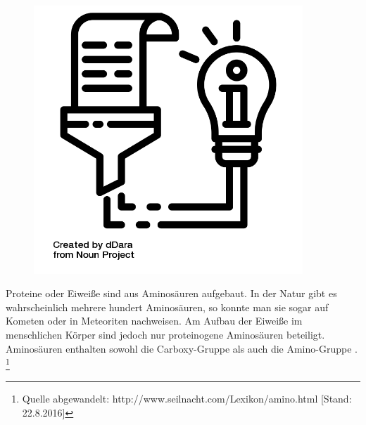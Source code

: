 \documentclass{scrartcl}  %
\begin{document}
\vspace{0.3cm}
			\begin{tcolorbox}[enhanced,
				colback=white,
				colframe=darkgray,
				fonttitle=\sffamily\bfseries\large, 
				title=Proteine,  %
				attach boxed title to top left={xshift=3.2mm,yshift=-0.50mm},
				boxed title style={skin=enhancedfirst jigsaw,size=small,arc=1mm,bottom=-1mm,colframe=darkgray,height=0.75cm},
				colbacktitle=darkgray,
				drop lifted shadow]
				\begin{figure}  
					\centering
					\vspace{-14pt}  %
					\includegraphics[width=0.9\textwidth]{symbols/symbol_tex_content}
				\end{figure}
				
				Proteine oder Eiweiße sind aus Aminosäuren aufgebaut. In der Natur gibt es wahrscheinlich mehrere hundert Aminosäuren, so konnte man sie sogar auf Kometen oder in Meteoriten nachweisen. Am Aufbau der Eiweiße im menschlichen Körper sind jedoch nur proteinogene Aminosäuren beteiligt. Aminosäuren enthalten sowohl die Carboxy-Gruppe  als auch die Amino-Gruppe .
				\footnote{Quelle abgewandelt: http://www.seilnacht.com/Lexikon/amino.html [Stand: 22.8.2016]}
			\end{tcolorbox}
\end{document}
